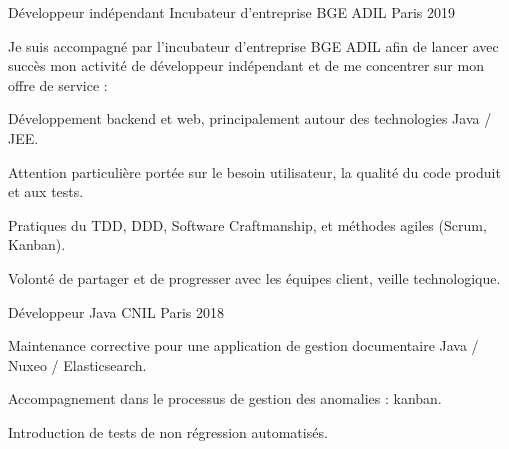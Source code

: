 

\begin{cventries}

  \cventry
    {Développeur indépendant} %
    {Incubateur d'entreprise BGE ADIL}
    {Paris} %
    {2019} %
    {
      \begin{cvitems} %
        \item {Je suis accompagné par l’incubateur d’entreprise BGE ADIL afin de lancer avec succès mon activité de développeur indépendant et de me concentrer sur mon offre de service : }
        \item {Développement backend et web, principalement autour des technologies Java / JEE.}
        \item {Attention particulière portée sur le besoin utilisateur, la qualité du code produit et aux tests.}
        \item {Pratiques du TDD, DDD, Software Craftmanship, et méthodes agiles (Scrum, Kanban).}
        \item {Volonté de partager et de progresser avec les équipes client, veille technologique.}
      \end{cvitems}
    }

  \cventry
    {Développeur Java} %
    {CNIL} %
    {Paris} %
    {2018} %
    {
      \begin{cvitems} %
        \item {Maintenance corrective pour une application de gestion documentaire Java / Nuxeo / Elasticsearch.}
        \item {Accompagnement dans le processus de gestion des anomalies : kanban.}
        \item {Introduction de tests de non régression automatisés.}
      \end{cvitems}
    }


\end{cventries}
